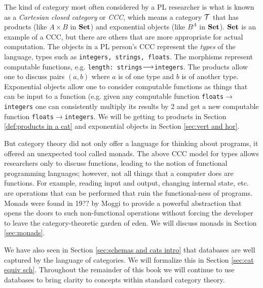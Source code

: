The kind of category most often considered by a PL researcher is what is known as a {\em Cartesian closed category} or {\em CCC}, which means a category $\mathcal{T}$ that has products (like $A\times B$ in ${\bf Set}$) and exponential objects (like $B^A$ in ${\bf Set}$). ${\bf Set}$ is an example of a CCC, but there are others that are more appropriate for actual computation. The objects in a PL person's CCC represent the {\em types} of the language, types such as {\tt integers, strings, floats}. The morphisms represent computable functions, e.g. {\tt length: strings}$\longrightarrow${\tt integers}. The products allow one to discuss pairs $(a,b)$ where $a$ is of one type and $b$ is of another type. Exponential objects allow one to consider computable functions as things that can be input to a function (e.g. given any computable function {\tt floats}$\to${\tt integers} one can consistently multiply its results by 2 and get a new computable function {\tt floats}$\to${\tt integers}. We will be getting to products in Section \ref{def:products in a cat} and exponential objects in Section \ref{sec:vert and hor}. 

But category theory did not only offer a language for thinking about programs, it offered an unexpected tool called monads. The above CCC model for types allows researchers only to discuss functions, leading to the notion of functional programming languages; however, not all things that a computer does are functions. For example, reading input and output, changing internal state, etc. are operations that can be performed that ruin the functional-ness of programs. Monads were found in 19?? by Moggi \cite{Mog} to provide a powerful abstraction that opens the doors to such non-functional operations without forcing the developer to leave the category-theoretic garden of eden. We will discuss monads in Section \ref{sec:monads}.

We have also seen in Section \ref{sec:schemas and cats intro} that databases are well captured by the language of categories. We will formalize this in Section \ref{sec:cat equiv sch}. Throughout the remainder of this book we will continue to use databases to bring clarity to concepts within standard category theory. 
 

\subsection{} 

